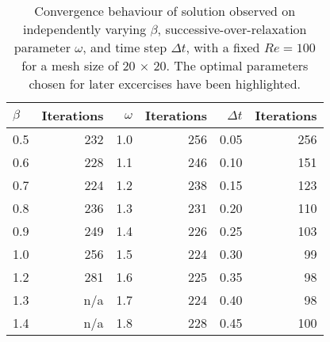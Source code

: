 \begin{table}
\begin{center}
\begin{tabular}{| l | r || r | r || r | r |}
\hline
$\beta$ & Iterations & $\omega$ & Iterations & $\Delta t$ & Iterations\\
\hline

0.5 & 232 & 1.0 & 256 & 0.05 & 256\\
0.6 & 228 & 1.1 & 246 & 0.10 & 151\\ \cline{1-2}
0.7 & 224 & 1.2 & 238 & 0.15 & 123\\ \cline{1-2}
0.8 & 236 & 1.3 & 231 & 0.20 & 110\\ \cline{5-6}
0.9 & 249 & 1.4 & 226 & 0.25 & 103\\ \cline{3-4} \cline{5-6}
1.0 & 256 & 1.5 & 224 & 0.30 & 99\\ \cline{3-4}
1.2 & 281 & 1.6 & 225 & 0.35 & 98\\
1.3 & n/a & 1.7 & 224 & 0.40 & 98\\
1.4 & n/a & 1.8 & 228 & 0.45 & 100\\

\hline
\end{tabular}
\caption{Convergence behaviour of solution observed on independently varying $\beta$, successive-over-relaxation parameter $\omega$, and time step $\Delta t$, with a fixed $Re = 100$ for a mesh size of 20 $\times$ 20. The optimal parameters chosen for later excercises have been highlighted.}
\label{tune}
\end{center}
\end{table}

